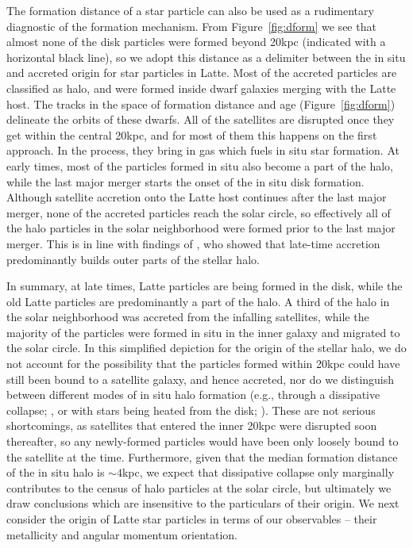 \documentclass[apj, twocolappendix, numberedappendix, appendixfloats]{emulateapj}
\begin{document}
The formation distance of a star particle can also be used as a rudimentary diagnostic of the formation mechanism.
From Figure~\ref{fig:dform} we see that almost none of the disk particles were formed beyond 20\;kpc (indicated with a horizontal black line), so we adopt this distance as a delimiter between the in situ and accreted origin for star particles in Latte.
Most of the accreted particles are classified as halo, and were formed inside dwarf galaxies merging with the Latte host.
The tracks in the space of formation distance and age (Figure~\ref{fig:dform}) delineate the orbits of these dwarfs.
All of the satellites are disrupted once they get within the central 20\;kpc, and for most of them this happens on the first approach.
In the process, they bring in gas which fuels in situ star formation.
At early times, most of the particles formed in situ also become a part of the halo, while the last major merger starts the onset of the in situ disk formation.
Although satellite accretion onto the Latte host continues after the last major merger, none of the accreted particles reach the solar circle, so effectively all of the halo particles in the solar neighborhood were formed prior to the last major merger.
This is in line with findings of \citet{zolotov2009}, who showed that late-time accretion predominantly builds outer parts of the stellar halo.

In summary, at late times, Latte particles are being formed in the disk, while the old Latte particles are predominantly a part of the halo.
A third of the halo in the solar neighborhood was accreted from the infalling satellites, while the majority of the particles were formed in situ in the inner galaxy and migrated to the solar circle.
In this simplified depiction for the origin of the stellar halo, we do not account for the possibility that the particles formed within 20\;kpc could have still been bound to a satellite galaxy, and hence accreted, nor do we distinguish between different modes of in situ halo formation (e.g., through a dissipative collapse; \citealt{samland2003}, or with stars being heated from the disk; \citealt{purcell2010}).
These are not serious shortcomings, as satellites that entered the inner 20\;kpc were disrupted soon thereafter, so any newly-formed particles would have been only loosely bound to the satellite at the time.
Furthermore, given that the median formation distance of the in situ halo is $\sim4$\;kpc, we expect that dissipative collapse only marginally contributes to the census of halo particles at the solar circle, but ultimately we draw conclusions which are insensitive to the particulars of their origin.
We next consider the origin of Latte star particles in terms of our observables -- their metallicity and angular momentum orientation.
\end{document}
